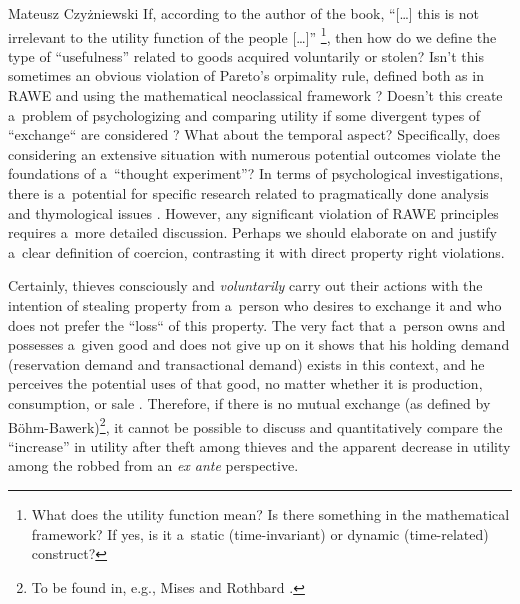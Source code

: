 \begin{newrevengenv}{Mateusz Czyżniewski}
If, according to the author of the book, ``[…] this is not irrelevant to the utility function of the people […]'' 
\parencite[][p.60]{megger_sprawiedliwosc_2021}%
\footnote{What does the utility function mean? Is there something in the mathematical framework? If yes, is it a~static (time-invariant) or dynamic (time-related) construct? }, then how do we define the type of ``usefulness'' related to goods acquired voluntarily or stolen? Isn't this sometimes an obvious violation of Pareto's orpimality rule, defined both as in RAWE 
\parencite[][]{rothbard_toward_2008} %
 and using the mathematical neoclassical framework 
\parencite[][pp.~173--183, 203--256 \mbox{[orig. 1947]}]{samuelson_foundations_1971}? %
 Doesn't this create a~problem of psychologizing and comparing utility if some divergent types of ``exchange`` are considered 
\parencite[][]{hausman_impossibility_1995}? %
 What about the temporal aspect? Specifically, does considering an extensive situation with numerous potential outcomes violate the foundations of a~``thought experiment''? In terms of psychological investigations, there is a~potential for specific research related to pragmatically done analysis and thymological issues 
\parencite[][pp.~264--284, 303--320 \mbox{[1\textsuperscript{st} ed. 1957]}]{mises_theory_1997}. %
 However, any significant violation of RAWE principles requires a~more detailed discussion. Perhaps we should elaborate on and justify a~clear definition of coercion, contrasting it with direct property right violations.



Certainly, thieves consciously and \textit{voluntarily} carry out their actions with the intention of stealing property from a~person who desires to exchange it and who does not prefer the ``loss`` of this property. The very fact that a~person owns and possesses a~given good and does not give up on it shows that his holding demand (reservation demand and transactional demand) exists in this context, and he perceives the potential uses of that good, no matter whether it is production, consumption, or sale 
\parencite[][pp.137–142]{rothbard_man_2009}. %
 Therefore, if there is no mutual exchange (as defined by Böhm-Bawerk)\footnote{To be found in, e.g., Mises 
\parencite[pp.213–232, 268–316][]{mises_human_1998} %
 and Rothbard 
\parencite[pp.95–169,][]{rothbard_man_2009}. %
 }, it cannot be possible to discuss and quantitatively compare the ``increase'' in utility after theft among thieves and the apparent decrease in utility among the robbed from an \textit{ex ante} perspective.




\end{newrevengenv}

